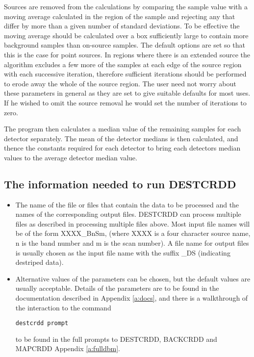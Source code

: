 Sources are removed from the calculations by comparing the sample value with
a moving average calculated in the region of the sample and rejecting any that
differ by more than a given number of standard deviations. To be effective the
moving average should be calculated over a box sufficiently large to contain 
more background samples than on-source samples. The default  options are set  
so that this is the  case for point sources. In regions where there is an
extended source the algorithm excludes a few more of the samples at each edge
of the source region with each successive iteration, therefore sufficient
iterations should be performed to erode away the whole of the source region.
The user need not worry about these parameters in general as they  are set to
give suitable defaults for most uses. If he wished to omit the source removal
he would set the number of iterations to zero.

The program then calculates a median value of the remaining samples for each 
detector separately. The mean of the detector medians is then calculated, and
thence the constants required for each detector to bring each detectors median 
values to the average detector median value.
\subsection{The information needed to run DESTCRDD}
\begin{itemize}
\item The name of the file or files that contain the data to be processed and
the names of the corresponding output files. DESTCRDD can process multiple 
files as described in processing multiple files above. Most input file names
will be of the form XXXX\_BnSm, (where XXXX is a four character source name, n
is the band number and m is the scan number). A file name for output files is 
usually chosen as the input file name with the suffix \_DS (indicating destriped
data).
\item Alternative values of the parameters can be chosen, but the default 
values are usually acceptable. Details of the parameters are to be found in
the documentation described in Appendix \ref{a:docs}, and there is a
walkthrough of the interaction to the command
\begin{small}
\begin{verbatim}
destcrdd prompt
\end{verbatim}
\end{small}
to be found in the full prompts to DESTCRDD, BACKCRDD and MAPCRDD Appendix
\ref{a:fulldbm}.
\end{itemize}
